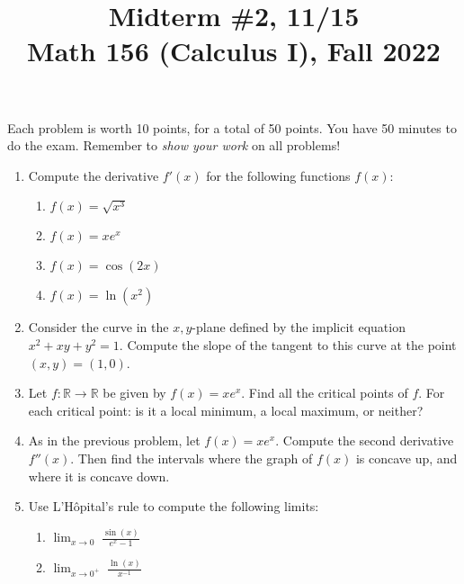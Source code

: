 \documentclass[11pt]{article}
\title{Midterm \#2, 11/15 \\ Math 156 (Calculus I), Fall 2022}
\date{}
\begin{document}
\maketitle

\thispagestyle{empty}

\vspace{-1cm}

Each problem is worth 10 points, for a total of 50 points. You have 50 minutes to do the exam. Remember to \emph{show your work} on all problems!

\begin{enumerate}
\item Compute the derivative $f'(x)$ for the following functions $f(x)$:
\begin{enumerate}
\item $f(x) = \sqrt{x^3}$
\item $f(x) = x e^{x}$
\item $f(x) = \cos(2x)$
\item $f(x) = \ln(x^2)$
\end{enumerate}

\item Consider the curve in the $x,y$-plane defined by the implicit equation $x^2 + xy + y^2 = 1$. Compute the slope of the tangent to this curve at the point $(x,y) = (1,0)$.

\item Let $f\colon \mathbb{R}\to \mathbb{R}$ be given by $f(x) = x e^{x}$. Find all the critical points of $f$. For each critical point: is it a local minimum, a local maximum, or neither?

\item As in the previous problem, let $f(x) = x e^{x}$. Compute the second derivative $f''(x)$. Then find the intervals where the graph of $f(x)$ is concave up, and where it is concave down.

\item Use L'H\^{o}pital's rule to compute the following limits:
\begin{enumerate}
\item $\displaystyle \lim_{x \to 0} \; \frac{\sin(x)}{e^x - 1}$ \\[0.25em]
\item $\displaystyle \lim_{x \to 0^+} \; \frac{\ln(x)}{x^{-1}}$
\end{enumerate}
\end{enumerate}
\end{document}
